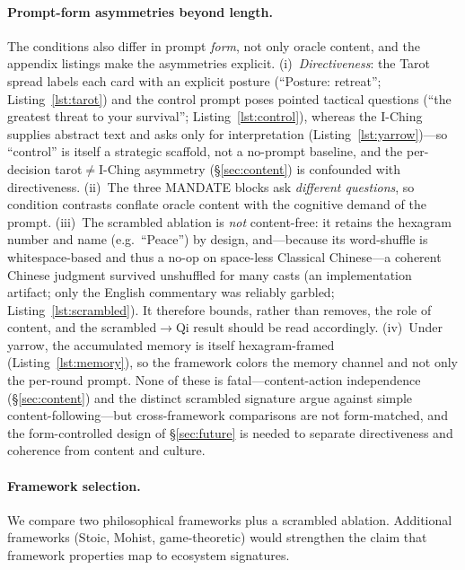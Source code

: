 \documentclass[11pt]{article}
\begin{document}
\paragraph{Prompt-form asymmetries beyond length.} The conditions also differ in prompt \emph{form}, not only oracle content, and the appendix listings make the asymmetries explicit. (i)~\emph{Directiveness}: the Tarot spread labels each card with an explicit posture (``Posture: retreat''; Listing~\ref{lst:tarot}) and the control prompt poses pointed tactical questions (``the greatest threat to your survival''; Listing~\ref{lst:control}), whereas the I-Ching supplies abstract text and asks only for interpretation (Listing~\ref{lst:yarrow})---so ``control'' is itself a strategic scaffold, not a no-prompt baseline, and the per-decision tarot$\neq$I-Ching asymmetry (\S\ref{sec:content}) is confounded with directiveness. (ii)~The three \textsc{MANDATE} blocks ask \emph{different questions}, so condition contrasts conflate oracle content with the cognitive demand of the prompt. (iii)~The scrambled ablation is \emph{not} content-free: it retains the hexagram number and name (e.g.\ ``Peace'') by design, and---because its word-shuffle is whitespace-based and thus a no-op on space-less Classical Chinese---a coherent Chinese judgment survived unshuffled for many casts (an implementation artifact; only the English commentary was reliably garbled; Listing~\ref{lst:scrambled}). It therefore bounds, rather than removes, the role of content, and the scrambled$\to$Qi result should be read accordingly. (iv)~Under yarrow, the accumulated memory is itself hexagram-framed (Listing~\ref{lst:memory}), so the framework colors the memory channel and not only the per-round prompt. None of these is fatal---content-action independence (\S\ref{sec:content}) and the distinct scrambled signature argue against simple content-following---but cross-framework comparisons are not form-matched, and the form-controlled design of \S\ref{sec:future} is needed to separate directiveness and coherence from content and culture.

\paragraph{Framework selection.} We compare two philosophical frameworks plus a scrambled ablation. Additional frameworks (Stoic, Mohist, game-theoretic) would strengthen the claim that framework properties map to ecosystem signatures.
\end{document}
